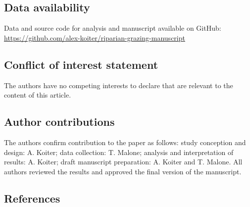 \documentclass[
]{agujournal2019}
\begin{document}
\subsection*{Data availability}\label{data-availability}

Data and source code for analysis and manuscript available on GitHub:
\url{https://github.com/alex-koiter/riparian-grazing-manuscript}

\subsection*{Conflict of interest
statement}\label{conflict-of-interest-statement}

The authors have no competing interests to declare that are relevant to
the content of this article.

\subsection*{Author contributions}\label{author-contributions}

The authors confirm contribution to the paper as follows: study
conception and design: A. Koiter; data collection: T. Malone; analysis
and interpretation of results: A. Koiter; draft manuscript preparation:
A. Koiter and T. Malone. All authors reviewed the results and approved
the final version of the manuscript.

\subsection*{References}\label{references}
\end{document}

